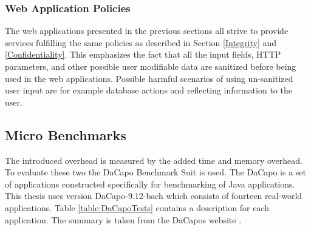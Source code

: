\subsubsection{Web Application Policies}
The web applications presented in the previous sections all strive to provide services fulfilling the same policies as described in Section \ref{Integrity} and \ref{Confidentiality}. This emphasizes the fact that all the input fields, HTTP parameters, and other possible user modifiable data are sanitized before being used in the web applications. Possible harmful scenarios of using un-sanitized user input are for example database actions and reflecting information to the user.



\subsection{Micro Benchmarks}
The introduced overhead is measured by the added time and memory overhead. To evaluate these two the DaCapo Benchmark Suit \parencite{dacapo} is used. The DaCapo is a set of applications constructed specifically for benchmarking of Java applications. This thesis uses version DaCapo-9.12-bach which consists of fourteen real-world applications. Table \ref{table:DaCapoTests} contains a description for each application. The summary is taken from the DaCapos website \parencite{dacapoBench}.

